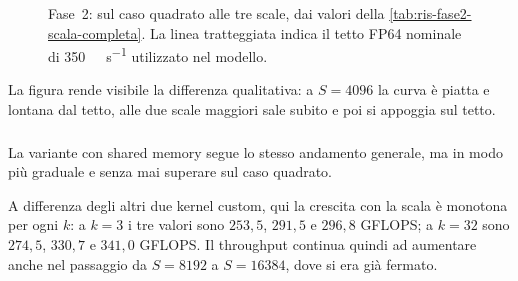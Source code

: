 \begin{figure}[H]
\centering
{}

\caption{Fase~2:  sul caso quadrato alle tre scale,
dai valori della \cref{tab:ris-fase2-scala-completa}. La linea tratteggiata
indica il tetto FP64 nominale di \SI{350}{\giga\flop\per\second} utilizzato
nel modello.}
\label{fig:ris-fase2-scala}
\end{figure}

La figura rende visibile la differenza qualitativa: a $S=4096$ la curva è
piatta e lontana dal tetto, alle due scale maggiori sale subito e poi si
appoggia sul tetto.

\subsubsection{}

La variante con shared memory segue lo stesso andamento generale, ma in modo
più graduale e senza mai superare  sul caso quadrato.

A differenza degli altri due kernel custom, qui la crescita con la scala è
monotona per ogni $k$: a $k=3$ i tre valori sono $253{,}5$, $291{,}5$ e
$296{,}8$ GFLOPS; a $k=32$ sono $274{,}5$, $330{,}7$ e $341{,}0$ GFLOPS. Il
throughput continua quindi ad aumentare anche nel passaggio da $S=8192$ a
$S=\num{16384}$, dove  si era già fermato.

